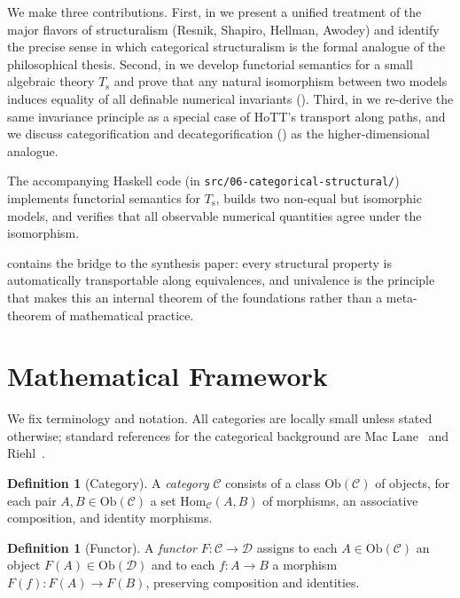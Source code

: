 \documentclass[12pt]{article}
\theoremstyle{definition}
\newtheorem{definition}[theorem]{Definition}
\theoremstyle{remark}
\newcommand{\Hom}{\mathrm{Hom}}
\newcommand{\C}{\mathcal{C}}
\newcommand{\D}{\mathcal{D}}
\newcommand{\succop}{\mathrm{s}}
\newcommand{\Ob}{\mathrm{Ob}}
\begin{document}
We make three contributions. First, in  we present a unified treatment of the major flavors of structuralism (Resnik, Shapiro, Hellman, Awodey) and identify the precise sense in which categorical structuralism is the formal analogue of the philosophical thesis. Second, in  we develop functorial semantics for a small algebraic theory $T_{\succop}$ and prove that any natural isomorphism between two models induces equality of all definable numerical invariants (). Third, in  we re-derive the same invariance principle as a special case of HoTT's transport along paths, and we discuss categorification and decategorification () as the higher-dimensional analogue.

The accompanying Haskell code (in \texttt{src/06-categorical-structural/}) implements functorial semantics for $T_{\succop}$, builds two non-equal but isomorphic models, and verifies that all observable numerical quantities agree under the isomorphism.

 contains the bridge to the synthesis paper: every structural property is automatically transportable along equivalences, and univalence is the principle that makes this an internal theorem of the foundations rather than a meta-theorem of mathematical practice.

\section{Mathematical Framework}\label{sec:framework}

We fix terminology and notation. All categories are locally small unless stated otherwise; standard references for the categorical background are Mac Lane~\cite{MacLane1971} and Riehl~\cite{Riehl2016}.

\begin{definition}[Category]
A \emph{category} $\C$ consists of a class $\Ob(\C)$ of objects, for each pair $A,B \in \Ob(\C)$ a set $\Hom_\C(A,B)$ of morphisms, an associative composition, and identity morphisms.
\end{definition}

\begin{definition}[Functor]
A \emph{functor} $F : \C \to \D$ assigns to each $A \in \Ob(\C)$ an object $F(A) \in \Ob(\D)$ and to each $f : A \to B$ a morphism $F(f) : F(A) \to F(B)$, preserving composition and identities.
\end{definition}
\end{document}

